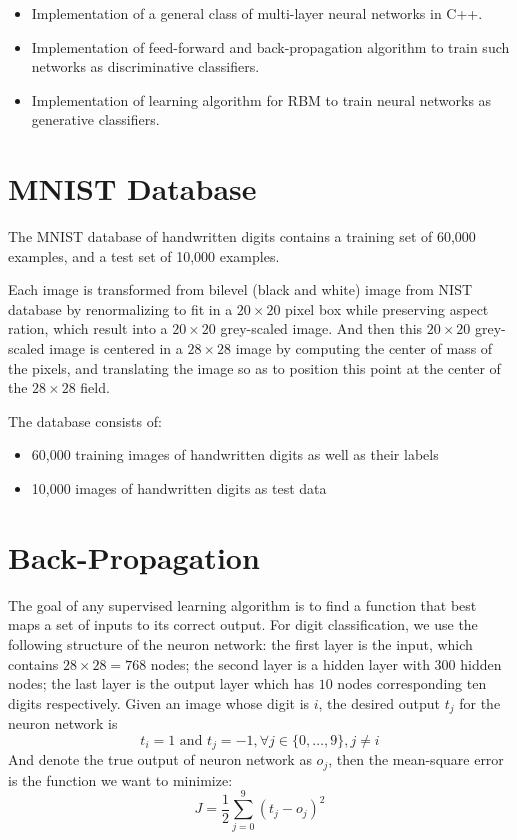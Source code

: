 \documentclass{article} %
\begin{document}
\begin{itemize}
\item   Implementation of a general class of multi-layer neural networks in C++.
\item   Implementation of feed-forward and back-propagation algorithm to train such networks as discriminative classifiers.
\item   Implementation of learning algorithm for RBM to train neural networks as generative classifiers.
\end{itemize}

\section{MNIST Database}

The MNIST database of handwritten digits contains a training set of 60,000 examples, and a test set of 10,000 examples.

Each image is transformed from bilevel (black and white) image from NIST database by renormalizing to fit in a $20\times20$ pixel box while preserving aspect ration, which result into a $20\times20$ grey-scaled image.
And then this $20\times20$ grey-scaled image is centered in a $28\times28$ image by computing the center of mass of the pixels, and translating the image so as to position this point at the center of the $28\times28$ field.

The database consists of:
\begin{itemize}
\item   60,000 training images of handwritten digits as well as their labels
\item   10,000 images of handwritten digits as test data
\end{itemize}


\section{Back-Propagation}
The goal of any supervised learning algorithm is to find a function that best maps a set of inputs to its correct output.
For digit classification, we use the following structure of the neuron network: the first layer is the input, which contains $28 \times 28 = 768$ nodes; the second layer is a hidden layer with $300$ hidden nodes; the last layer is the output layer which has $10$ nodes corresponding ten digits respectively.
Given an image whose digit is $i$, the desired output $t_j$ for the neuron network is
\[ t_i = 1 \textrm{ and } t_j = -1, \forall j \in \{0,\ldots,9\}, j \ne i \]
And denote the true output of neuron network as $o_j$, then the mean-square error is the function we want to minimize:
\[ J = \frac{1}{2} \sum_{j=0}^9 {(t_j-o_j)}^2 \]
\end{document}
